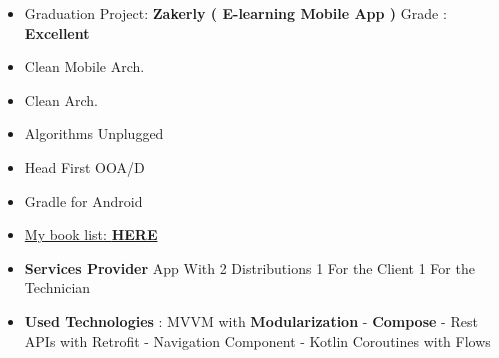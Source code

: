 \documentclass[10pt,a4paper,ragged2e,withhyper]{altacv}
\begin{document}
\begin{paracol}{2}
{\begin{itemize}
        \end{itemize}}


        \begin{itemize}
            \item Graduation Project: \textbf{Zakerly ( E-learning Mobile App )} Grade : \textbf{Excellent}
        \end{itemize}


        \begin{multicols}{3}

        {\small\begin{itemize}
                   \item[\textcolor{PrimaryColor}{\faBook}] Clean Mobile Arch.
                   \item[\textcolor{PrimaryColor}{\faBook}] Clean Arch.
                   \item[\textcolor{PrimaryColor}{\faBook}] Algorithms Unplugged
                   \item[\textcolor{PrimaryColor}{\faBook}] Head First OOA/D
                   \item[\textcolor{PrimaryColor}{\faBook}] Gradle for Android
                   \item[\textcolor{PrimaryColor}{\faTrello}] \href{https://trello.com/b/pkZlgQVu/my-readings-board}{My book list: \textbf{\textcolor{TertiaryColor}{HERE}}}
        \end{itemize}}

        \end{multicols}

    \end{paracol}

    \vspace{2px}

    \vspace{2px}


    \hypertarget{samoolah}{}



    \begin{itemize}
        \item \textbf{Services Provider} App With 2 Distributions 1 For the Client 1 For the Technician
        \item \textbf{Used Technologies} : MVVM with \textbf{Modularization} - \textbf{Compose} - Rest APIs with Retrofit - Navigation Component - Kotlin Coroutines with Flows
    \end{itemize}
    \divider
\end{document}
